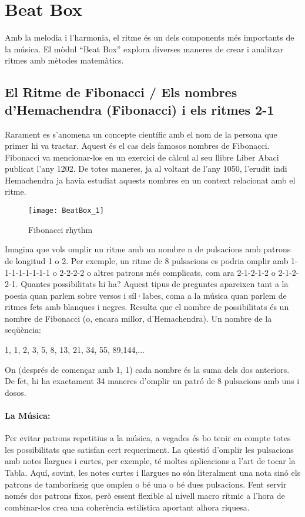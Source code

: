 \section{Beat Box}
Amb la melodia i l'harmonia, el ritme és un dels components més importants de la música. El mòdul ``Beat Box'' explora diverses maneres de crear i analitzar ritmes amb mètodes matemàtics.

\subsection{El Ritme de Fibonacci / Els nombres d'Hemachendra (Fibonacci) i els ritmes 2-1}

Rarament es s'anomena un concepte científic amb el nom de la persona que primer hi va tractar. Aquest és el cas dels famosos nombres de Fibonacci. Fibonacci va mencionar-los en un exercici de càlcul al seu llibre Liber Abaci publicat l'any 1202. De totes maneres, ja al voltant de l'any 1050, l'erudit indi Hemachendra ja havia estudiat aquests nombres en un context relacionat amb el ritme.

\begin{wrapfigure}{l}{0.4\textwidth}
\centering
\texttt{[image: BeatBox\_1]}
\caption*{Fibonacci rhythm}
\end{wrapfigure}

Imagina que vols omplir un ritme amb un nombre n de pulsacions amb patrons de longitud 1 o 2. Per exemple, un ritme de 8 pulsacions es podria omplir amb 1-1-1-1-1-1-1-1 o 2-2-2-2 o altres patrons més complicats, com ara 2-1-2-1-2 o 2-1-2-2-1. Quantes possibilitats hi ha? Aquest tipus de preguntes apareixen tant a la poesia quan parlem sobre versos i síl·labes, coma a la música quan parlem de ritmes fets amb blanques i negres. Resulta que el nombre de possibilitats és un nombre de Fibonacci (o, encara millor, d'Hemachendra). Un nombre de la seqüència:

1, 1, 2, 3, 5, 8, 13, 21, 34, 55, 89,144,...

On (després de començar amb 1, 1) cada nombre és la suma dels dos anteriors. De fet, hi ha exactament 34 maneres d'omplir un patró de 8 pulsacions amb uns i dosos.

\paragraph{La Música:}
Per evitar patrons repetitius a la música, a vegades és bo tenir en compte totes les possibilitats que satisfan cert requeriment. La qüestió d'omplir les pulsacions amb notes llargues i curtes, per exemple, té moltes aplicacions a l'art de tocar la Tabla. Aquí, sovint, les notes curtes i llargues no són literalment una nota sinó els patrons de tamborineig que omplen o bé una o bé dues pulsacions. Fent servir només dos patrons fixos, però essent flexible al nivell macro rítmic a l'hora de combinar-los  crea una coherència estilística aportant alhora riquesa.

